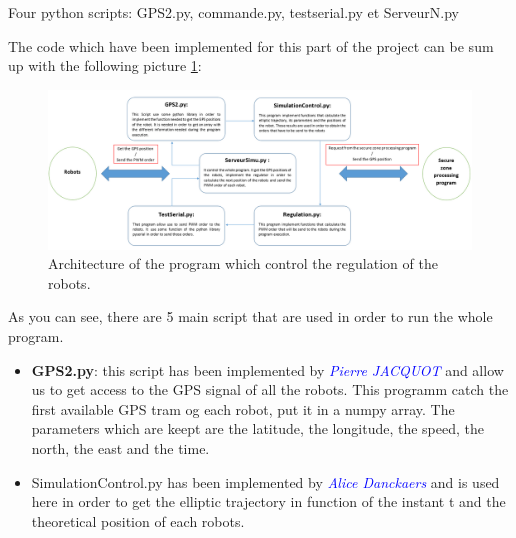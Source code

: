 

Four python scripts: GPS2.py, commande.py, testserial.py et ServeurN.py

The code which have been implemented for this part of the project can be sum up with the following picture \ref{fig:SyntheseCodeRegulationRobot}:

\begin{figure}[ht]
\centering
    \includegraphics[scale=0.5,angle=90]{SyntheseCodeRegulationRobot.PNG}
    \caption{Architecture of the program which control the regulation of the robots.}
    \label{fig:SyntheseCodeRegulationRobot}
\end{figure}

As you can see, there are 5 main script that are used in order to run the whole program.

\begin{itemize}
\item \textbf{GPS2.py}: this script has been implemented by \textcolor{blue}{\textit{Pierre JACQUOT}} and allow us to get access to the GPS signal of all the robots. This programm catch the first available GPS tram og each robot, put it in a numpy array. The parameters which are keept are the latitude, the longitude, the speed, the north, the east and the time.
\item SimulationControl.py has been implemented by  \textcolor{blue}{\textit{Alice Danckaers}} and is used here in order to get the elliptic trajectory in function of the instant t and the theoretical position of each robots.

\end{itemize}
\pagebreak